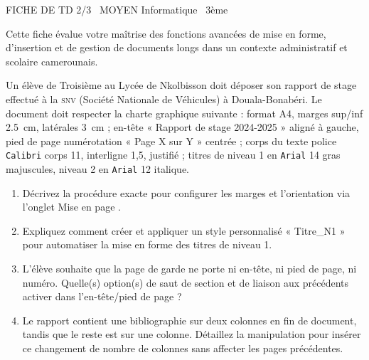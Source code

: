 \documentclass[11pt]{article}
\begin{document}
\begin{tcolorbox}[enhanced,colback=popink,colframe=popink,arc=10pt,boxrule=0pt,left=12pt,right=12pt,top=9pt,bottom=9pt]
{\color{white}\popxbold\small FICHE DE TD 2/3 \textbullet\ MOYEN \hfill Informatique \textbullet\ 3ème\par}
\end{tcolorbox}
\vspace{4pt}
Cette fiche évalue votre maîtrise des fonctions avancées de mise en forme, d'insertion et de gestion de documents longs dans un contexte administratif et scolaire camerounais.

\begin{exercice}
Un élève de Troisième au Lycée de Nkolbisson doit déposer son rapport de stage effectué à la \textsc{snv} (Société Nationale de Véhicules) à Douala-Bonabéri. Le document doit respecter la charte graphique suivante : format A4, marges sup/inf \SI{2,5}{cm}, latérales \SI{3}{cm} ; en-tête « Rapport de stage 2024-2025 » aligné à gauche, pied de page numérotation « Page X sur Y » centrée ; corps du texte police \texttt{Calibri} corps 11, interligne 1,5, justifié ; titres de niveau 1 en \texttt{Arial} 14 gras majuscules, niveau 2 en \texttt{Arial} 12 italique.
\begin{enumerate}
    \item Décrivez la procédure exacte pour configurer les marges et l'orientation via l'onglet \og Mise en page \fg.
    \item Expliquez comment créer et appliquer un style personnalisé « Titre\_N1 » pour automatiser la mise en forme des titres de niveau 1.
    \item L'élève souhaite que la page de garde ne porte ni en-tête, ni pied de page, ni numéro. Quelle(s) option(s) de saut de section et de liaison aux précédents activer dans l'en-tête/pied de page ?
    \item Le rapport contient une bibliographie sur deux colonnes en fin de document, tandis que le reste est sur une colonne. Détaillez la manipulation pour insérer ce changement de nombre de colonnes sans affecter les pages précédentes.
\end{enumerate}
\end{exercice}
\end{document}
